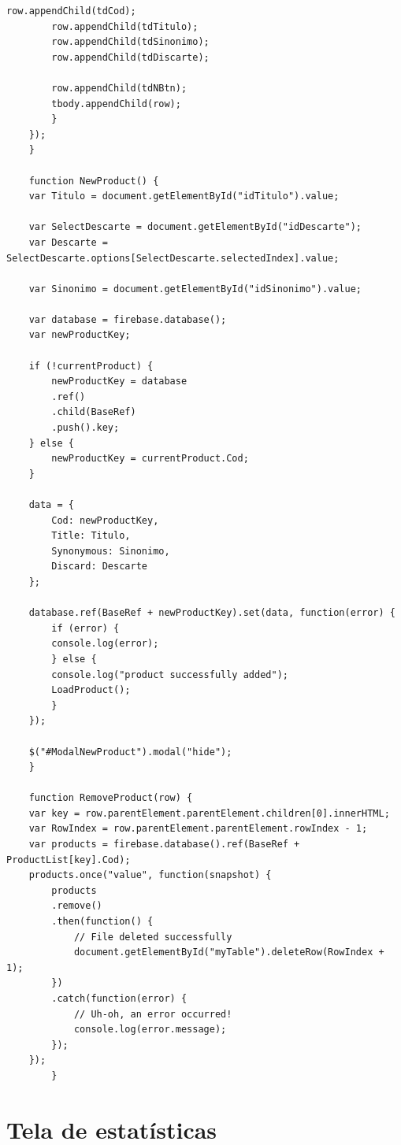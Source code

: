 \documentclass[
	12pt,				%
	openright,			%
	twoside,			%
	a4paper,			%
	english,			%
	french,				%
	spanish,			%
	brazil				%
	]{abntex2}
\begin{document}
\begin{apendicesenv}
\begin{lstlisting}[numbers=none,
basicstyle=\small,
caption={Product.js},
title={Product.js},
label={Product.js}]
        row.appendChild(tdCod);
        row.appendChild(tdTitulo);
        row.appendChild(tdSinonimo);    
        row.appendChild(tdDiscarte);

        row.appendChild(tdNBtn);
        tbody.appendChild(row);
        }
    });
    }

    function NewProduct() {
    var Titulo = document.getElementById("idTitulo").value;  

    var SelectDescarte = document.getElementById("idDescarte");
    var Descarte = SelectDescarte.options[SelectDescarte.selectedIndex].value;

    var Sinonimo = document.getElementById("idSinonimo").value;

    var database = firebase.database();
    var newProductKey;

    if (!currentProduct) {
        newProductKey = database
        .ref()
        .child(BaseRef)
        .push().key;
    } else {
        newProductKey = currentProduct.Cod;
    }

    data = {
        Cod: newProductKey,
        Title: Titulo,
        Synonymous: Sinonimo,
        Discard: Descarte  
    };

    database.ref(BaseRef + newProductKey).set(data, function(error) {
        if (error) {
        console.log(error);
        } else {
        console.log("product successfully added");
        LoadProduct();
        }
    });

    $("#ModalNewProduct").modal("hide");
    }

    function RemoveProduct(row) {
    var key = row.parentElement.parentElement.children[0].innerHTML;
    var RowIndex = row.parentElement.parentElement.rowIndex - 1;
    var products = firebase.database().ref(BaseRef + ProductList[key].Cod);
    products.once("value", function(snapshot) {
        products
        .remove()
        .then(function() {
            // File deleted successfully
            document.getElementById("myTable").deleteRow(RowIndex + 1);
        })
        .catch(function(error) {
            // Uh-oh, an error occurred!
            console.log(error.message);
        });
    });
        }

\end{lstlisting}
\section{Tela de estatísticas} \label{cod_stats}
\begin{lstlisting}[numbers=none,
basicstyle=\small,
caption={Stats.js},
title={Stats.js},
label={Stats.js}]


\end{lstlisting}
\end{apendicesenv}
\end{document}
